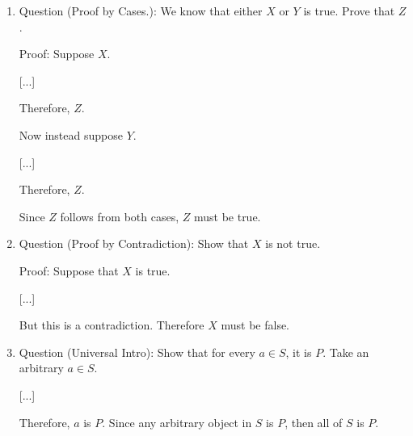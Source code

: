 \documentclass[../../include/open-logic-section]{subfiles}
\begin{document}
\begin{enumerate}
\item Question (Proof by Cases.): We know that either $X$ or $Y$ is true.
Prove that $Z$.

Proof: Suppose $X$.

[...]

Therefore, $Z$.

Now instead suppose $Y$.

[...]

Therefore, $Z$.

Since $Z$ follows from both cases, $Z$ must be true.

\item Question (Proof by Contradiction): Show that $X$ is not true.

Proof: Suppose that $X$ is true.

[...]

But this is a contradiction. Therefore $X$ must be false.

\item Question (Universal Intro): Show that for every $a \in S$, it is $P$.
Take an arbitrary $a \in S$.

[...]

Therefore, $a$ is $P$. Since any arbitrary object in $S$ is $P$, then all
of $S$ is $P$.

\end{enumerate}
\end{document}
